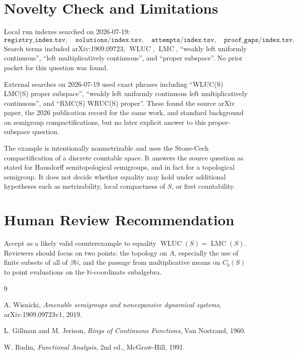 \documentclass[11pt]{article}
\newcommand{\N}{\mathbb N}
\newcommand{\WLUC}{\operatorname{WLUC}}
\newcommand{\LMC}{\operatorname{LMC}}
\newcommand{\Cb}{C_b}
\newcommand{\betaN}{\beta\N}
\begin{document}
\section*{Novelty Check and Limitations}

Local run indexes searched on 2026-07-19:
\[
\texttt{registry\_index.tsv},\quad
\texttt{solutions/index.tsv},\quad
\texttt{attempts/index.tsv},\quad
\texttt{proof\_gaps/index.tsv}.
\]
Search terms included arXiv:1909.09723, \(\WLUC\), \(\LMC\), ``weakly left
uniformly continuous'', ``left multiplicatively continuous'', and ``proper
subspace''. No prior packet for this question was found.

External searches on 2026-07-19 used exact phrases including
``WLUC(S) LMC(S) proper subspace'', ``weakly left uniformly continuous left
multiplicatively continuous'', and ``RMC(S) WRUC(S) proper''. These found the
source arXiv paper, the 2026 publication record for the same work, and standard
background on semigroup compactifications, but no later explicit answer to this
proper-subspace question.

The example is intentionally nonmetrizable and uses the Stone-Cech
compactification of a discrete countable space. It answers the source question
as stated for Hausdorff semitopological semigroups, and in fact for a
topological semigroup. It does not decide whether equality may hold under
additional hypotheses such as metrizability, local compactness of \(S\), or
first countability.

\section*{Human Review Recommendation}

Accept as a likely valid counterexample to equality \(\WLUC(S)=\LMC(S)\).
Reviewers should focus on two points: the topology on \(A\), especially the use
of finite subsets of all of \(\betaN\), and the passage from multiplicative
means on \(\Cb(S)\) to point evaluations on the \(\N\)-coordinate subalgebra.

\begin{thebibliography}{9}

A. Wisnicki,
\emph{Amenable semigroups and nonexpansive dynamical systems},
arXiv:1909.09723v1, 2019.

L. Gillman and M. Jerison,
\emph{Rings of Continuous Functions},
Van Nostrand, 1960.

W. Rudin,
\emph{Functional Analysis},
2nd ed., McGraw-Hill, 1991.

\end{thebibliography}
\end{document}
